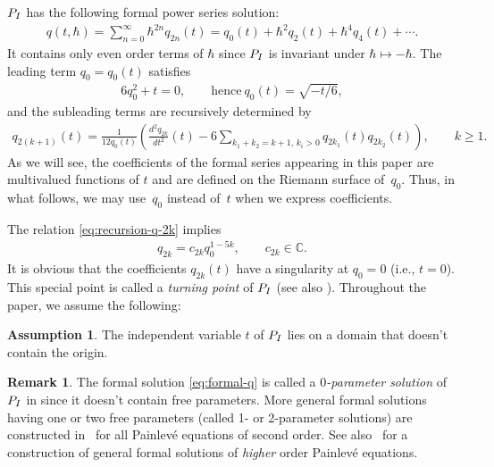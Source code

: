 \documentclass[11pt]{article}
\theoremstyle{definition}
\newtheorem{rem}[thm]{Remark}
\newtheorem{ass}[thm]{Assumption}
\numberwithin{equation}{section}
\def\PI{P_{\rm I}}
\def\bbC{{\mathbb C}}
\begin{document}
$\PI$ has the following formal power series solution:
\begin{gather} \label{eq:formal-q}
q(t,\hbar) = \sum_{n=0}^{\infty} \hbar^{2n}q_{2n}(t)
= q_{0}(t) + \hbar^{2} q_{2}(t)
+ \hbar^{4} q_{4}(t) + \cdots.
\end{gather}
It contains only even order terms of $\hbar$ since $\PI$
is invariant under $\hbar \mapsto - \hbar$.
The leading term $q_{0} = q_{0}(t)$ satisf\/ies
\begin{gather} \label{eq:q0}
6q_{0}^{2} + t = 0, \qquad \text{hence}~q_{0}(t)=\sqrt{-t/6},
\end{gather}
and the subleading terms are recursively determined by
\begin{gather} \label{eq:recursion-q-2k}
q_{2(k+1)}(t) = \frac{1}{12 q_{0}(t)} \left(
\frac{d^{2} q_{2k}}{dt^{2}}(t)  -
6 \sum_{k_{1}+k_{2} = k+1,\,  k_{i}>0} q_{2k_{1}}(t) q_{2k_{2}}(t)
\right), \qquad k \ge 1.
\end{gather}
As we will see, the coef\/f\/icients of the formal series appearing in
this paper are multivalued functions of $t$ and are def\/ined
on the Riemann surface of~$q_{0}$. Thus, in what follows,
we may use~$q_{0}$ instead of~$t$ when we express coef\/f\/icients.

The relation \eqref{eq:recursion-q-2k} implies
\begin{gather*}
q_{2k} =
c_{2k} q_{0}^{1-5k}, \qquad c_{2k} \in \bbC .
\end{gather*}
It is obvious that the coef\/f\/icients $q_{2k}(t)$ have
a singularity at $q_{0} = 0$ (i.e., $t = 0$).
This special point is called a {\em turning point} of $\PI$
\cite[Def\/inition 2.1]{KT-PI} (see also \cite[Section~4]{KT05}).
Throughout the paper, we assume the following:

\begin{ass}
The independent variable $t$ of $\PI$
lies on a domain that doesn't contain the origin.
\end{ass}


\begin{rem}
The formal solution \eqref{eq:formal-q} is called a
{\em $0$-parameter solution} of $\PI$ in \cite{KT05}
since it doesn't contain free parameters.
More general formal solutions having
one or two free para\-me\-ters (called 1- or 2-parameter solutions)
are constructed in~\cite{AKT-P} for all Painlev\'e equations
of second order.
See also~\cite{Umeta} for a construction of general formal
solutions of {\em higher} order Painlev\'e equations.
\end{rem}
\end{document}

